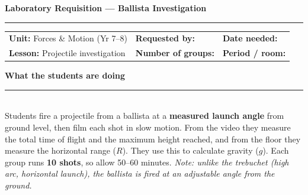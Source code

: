 \documentclass[11pt,a4paper]{article}
\newcommand{\sechead}[1]{%
  \vspace{0pt}%
  {\bfseries\large\color{HeadGrey} #1}\\[-2pt]
  {\color{RuleGrey}\rule{\linewidth}{0.8pt}}\\[1pt]
}
\begin{document}
\pagestyle{empty}
\small

{\LARGE\bfseries\color{Ink} Laboratory Requisition --- Ballista Investigation}\\[3pt]
{\color{RuleGrey}\rule{\linewidth}{1.2pt}}

\vspace{3pt}
\begin{tabularx}{\linewidth}{@{}X X X@{}}
\textbf{Unit:} Forces \& Motion (Yr 7--8) &
\textbf{Requested by:} \underline{\hspace{3.5cm}} &
\textbf{Date needed:} \underline{\hspace{2.8cm}} \\
\textbf{Lesson:} Projectile investigation &
\textbf{Number of groups:} \underline{\hspace{2cm}} &
\textbf{Period / room:} \underline{\hspace{2.6cm}} \\
\end{tabularx}

\sechead{What the students are doing}
Students fire a projectile from a ballista at a \textbf{measured launch angle} from ground level, then film each shot in slow motion. From the video they measure the total time of flight and the maximum height reached, and from the floor they measure the horizontal range ($R$). They use this to calculate gravity ($g$). Each group runs \textbf{10 shots}, so allow 50--60 minutes. \emph{Note: unlike the trebuchet (high arc, horizontal launch), the ballista is fired at an adjustable angle from the ground.}
\end{document}
